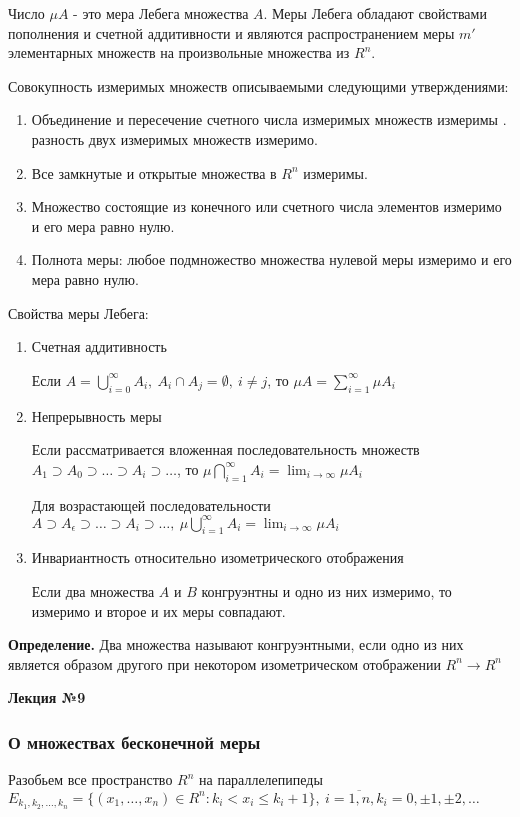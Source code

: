 \documentclass[14pt,a4paper]{extarticle}
\theoremstyle{definition}
\theoremstyle{remark}
\renewcommand{\[}{\begin{dmath*}[compact]}
\renewcommand{\]}{\end{dmath*}}
\newcommand{\be}{\begin{enumerate}}
\newcommand{\ee}{\end{enumerate}}
\newcommand{\sep}{ , \ \allowbreak }
\newcommand{\tdef}{\textbf{Определение.} }
\begin{document}
Число $\mu A$ - это мера Лебега множества $A$. Меры Лебега обладают свойствами пополнения и счетной аддитивности и являются распространением меры $m'$ элементарных множеств на произвольные множества из $R^n$.

Совокупность измеримых множеств описываемыми следующими утверждениями:
\be
  \item Объединение и пересечение счетного числа измеримых множеств измеримы . разность двух измеримых множеств измеримо.
  \item Все замкнутые и открытые множества в $R^n$ измеримы.
  \item Множество состоящие из конечного или счетного числа элементов измеримо и его мера равно нулю.
  \item Полнота меры: любое подмножество множества нулевой меры измеримо и его мера равно нулю.
\ee

Свойства меры Лебега:
\be
  \item Счетная аддитивность

  Если $A=\bigcup _{i=0}^\infty A_i\sep A_i\cap A_j=\emptyset\sep i\neq j$, то $\mu A=\sum_{i=1}^\infty \mu A_i$

  \item Непрерывность меры

  Если рассматривается вложенная последовательность множеств $A_1 \supset A_0 \supset \dots \supset A_i \supset \dots$, то $\mu\bigcap _{i=1}^\infty A_i=\lim_{i \to \infty} \mu A_i $

  Для возрастающей последовательности $A \supset A _ \epsilon \supset \dots \supset A_i \supset \dots \sep \mu \bigcup _ {i = 1}  ^ \infty A_i = \lim_{i \to \infty} \mu A_i$

  \item Инвариантность относительно изометрического отображения

  Если два множества $A$ и $B$ конгруэнтны и одно из них измеримо, то измеримо и второе и их меры совпадают.
\ee

\tdef Два множества называют конгруэнтными, если одно из них является образом другого при некотором изометрическом отображении $R^n \to R^n$

\textbf{Лекция №9}

\subsubsection{О множествах бесконечной меры}

Разобьем все пространство $R^n$ на параллелепипеды $E_{k_1,k_2,\dots,k_n}=\{(x_1,\dots,x_n) \in R^n:k_i<x_i \leq k_i+1 \} \sep i=\overline{1,n}, k_i=0, \pm 1, \pm 2, \dots$
\end{document}
